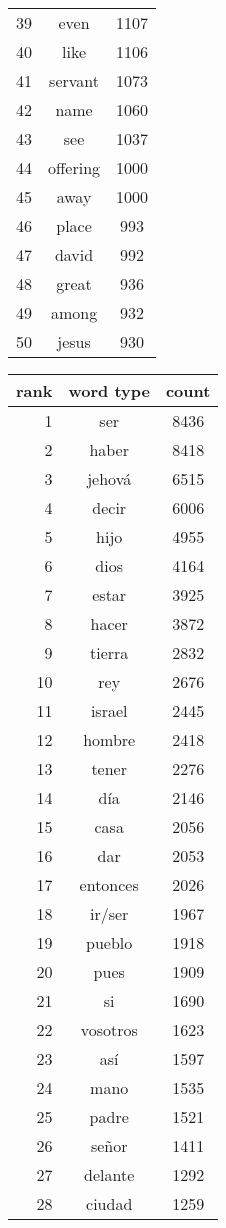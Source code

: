 \begin{figure*}
\begin{tiny}
\begin{centering}
\begin{tabular}{|r|c|c|}
39 & even & 1107 \\
40 & like & 1106 \\
41 & servant & 1073 \\
42 & name & 1060 \\
43 & see & 1037 \\
44 & offering & 1000 \\
45 & away & 1000 \\
46 & place & 993 \\
47 & david & 992 \\
48 & great & 936 \\
49 & among & 932 \\
50 & jesus & 930 \\
    \hline
  \end{tabular}
  \quad
  \begin{tabular}{|r|c|c|}
    \hline
    rank & word type & count \\
    \hline
1 & ser & 8436 \\
2 & haber & 8418 \\
3 & jehová & 6515 \\
4 & decir & 6006 \\
5 & hijo & 4955 \\
6 & dios & 4164 \\
7 & estar & 3925 \\
8 & hacer & 3872 \\
9 & tierra & 2832 \\
10 & rey & 2676 \\
11 & israel & 2445 \\
12 & hombre & 2418 \\
13 & tener & 2276 \\
14 & día & 2146 \\
15 & casa & 2056 \\
16 & dar & 2053 \\
17 & entonces & 2026 \\
18 & ir/ser & 1967 \\
19 & pueblo & 1918 \\
20 & pues & 1909 \\
21 & si & 1690 \\
22 & vosotros & 1623 \\
23 & así & 1597 \\
24 & mano & 1535 \\
25 & padre & 1521 \\
26 & señor & 1411 \\
27 & delante & 1292 \\
28 & ciudad & 1259 \\

\end{tabular}
\end{centering}
\end{tiny}
\end{figure*}
